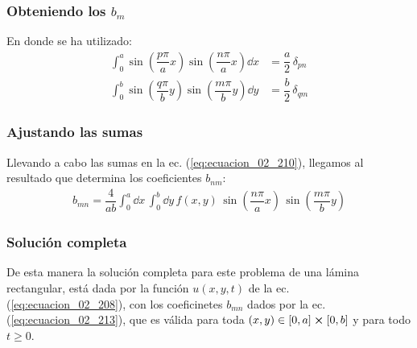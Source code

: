 \documentclass[12pt]{beamer}
\begin{document}
\begin{frame}
\frametitle{Obteniendo los $b_{m}$}
En donde se ha utilizado:
\begin{align}
\int_{0}^{a} \sin \left( \dfrac{p \pi}{a} x \right) \sin \left( \dfrac{n \pi}{a} x \right) \dd{x} &= \dfrac{a}{2} \, \delta_{pn} \label{eq:ecuacion_02_211} \\[0.5em]
\int_{0}^{b} \sin \left( \dfrac{q \pi}{b} y \right) \sin \left( \dfrac{m \pi}{b} y \right) \dd{y} &= \dfrac{b}{2} \, \delta_{qm} \label{eq:ecuacion_02_212}
\end{align}
\end{frame}
\begin{frame}
\frametitle{Ajustando las sumas}
Llevando a cabo las sumas en la ec. (\ref{eq:ecuacion_02_210}), llegamos al resultado que determina los coeficientes $b_{nm}$:
\begin{align}
b_{mn} = \dfrac{4}{ab} \int_{0}^{a} \dd{x} \, \int_{0}^{b} \dd{y} \, f(x, y) \, \sin \left( \dfrac{n \pi}{a} x \right) \, \sin \left( \dfrac{m \pi}{b} y \right)
\label{eq:ecuacion_02_213}
\end{align}
\end{frame}
\begin{frame}
\frametitle{Solución completa}
De esta manera la solución completa para este problema de una lámina rectangular, está dada por la función $u(x, y, t)$ de la ec. (\ref{eq:ecuacion_02_208}), con los coeficinetes $b_{mn}$ dados por la ec. (\ref{eq:ecuacion_02_213}), que es válida para toda $(x, y) \in [0, a] \cp [0, b]$ y para todo $t \geq 0$. 
\end{frame}
\end{document}
